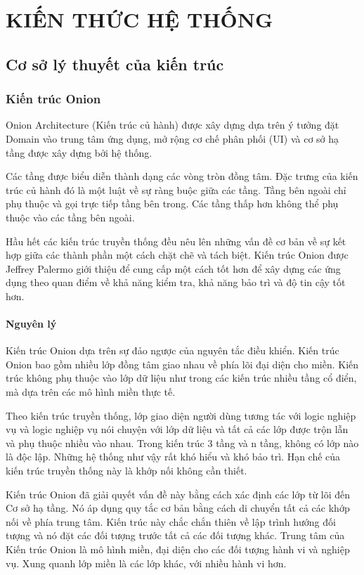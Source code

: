 \chapter{KIẾN THỨC HỆ THỐNG}

\section{Cơ sở lý thuyết của kiến trúc}

\subsection{Kiến trúc Onion}

Onion Architecture (Kiến trúc củ hành) được xây dựng dựa trên ý tưởng đặt Domain vào trung tâm ứng dụng, mở rộng cơ chế phân phối (UI) và cơ sở hạ tầng được xây dựng bởi hệ thống.

Các tầng được biểu diễn thành dạng các vòng tròn đồng tâm. Đặc trưng của kiến trúc củ hành đó là một luật về sự ràng buộc giữa các tầng. Tầng bên ngoài chỉ phụ thuộc và gọi trực tiếp tầng bên trong. Các tầng thấp hơn không thể phụ thuộc vào các tầng bên ngoài.

Hầu hết các kiến trúc truyền thống đều nêu lên những vấn đề cơ bản về sự kết hợp giữa các thành phần một cách chặt chẽ và tách biệt. Kiến trúc Onion được Jeffrey Palermo giới thiệu để cung cấp một cách tốt hơn để xây dựng các ứng dụng theo quan điểm về khả năng kiểm tra, khả năng bảo trì và độ tin cậy tốt hơn.

\subsubsection{Nguyên lý}

Kiến trúc Onion dựa trên sự đảo ngược của nguyên tắc điều khiển. Kiến trúc Onion bao gồm nhiều lớp đồng tâm giao nhau về phía lõi đại diện cho miền. Kiến trúc không phụ thuộc vào lớp dữ liệu như trong các kiến trúc nhiều tầng cổ điển, mà dựa trên các mô hình miền thực tế.

Theo kiến trúc truyền thống, lớp giao diện người dùng tương tác với logic nghiệp vụ và logic nghiệp vụ nói chuyện với lớp dữ liệu và tất cả các lớp được trộn lẫn và phụ thuộc nhiều vào nhau. Trong kiến trúc 3 tầng và n tầng, không có lớp nào là độc lập. Những hệ thống như vậy rất khó hiểu và khó bảo trì. Hạn chế của kiến trúc truyền thống này là khớp nối không cần thiết.

Kiến trúc Onion đã giải quyết vấn đề này bằng cách xác định các lớp từ lõi đến Cơ sở hạ tầng. Nó áp dụng quy tắc cơ bản bằng cách di chuyển tất cả các khớp nối về phía trung tâm. Kiến trúc này chắc chắn thiên về lập trình hướng đối tượng và nó đặt các đối tượng trước tất cả các đối tượng khác. Trung tâm của Kiến trúc Onion là mô hình miền, đại diện cho các đối tượng hành vi và nghiệp vụ. Xung quanh lớp miền là các lớp khác, với nhiều hành vi hơn.

